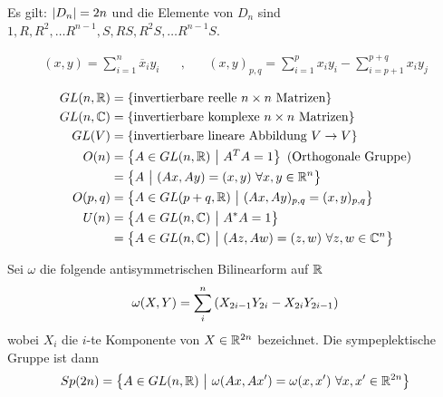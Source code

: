 \begin{lemma}
    Es gilt: $\left\vert D_n \right\vert = 2n$ und die Elemente von $D_n$ sind
    $1,R,R^2,\dots R^{n-1},S,RS,R^2S,\dots R^{n-1} S$.
\end{lemma}

\begin{definition}[Skalarprodukt]
    \begin{align*}
        (x,y) = \sum_{i=1}^n \overline{x}_i y_i
        \hspace{20pt} , \hspace{20pt}
        (x,y)_{p,q} = \sum_{i=1}^p x_i y_i - \sum_{i=p+1}^{p+q} x_i y_j
    \end{align*}
\end{definition}

\begin{definition}
    \begin{align*}
        GL(n,\R) &= \geschwungeneklammer{\text{invertierbare reelle } n \times n \text{ Matrizen}}
        \\
        GL(n,\C) &= \geschwungeneklammer{\text{invertierbare komplexe } n \times n \text{ Matrizen}}
        \\
        GL(V) &= \geschwungeneklammer{\text{invertierbare lineare Abbildung } V \rightarrow V}
        \\
        O(n) &= \geschwungeneklammer{A \in GL(n,\R) \ \big| \ A^T A = 1} \ \text{(Orthogonale Gruppe)}
        \\
        &= \geschwungeneklammer{A \ \big| \ (Ax,Ay) = (x,y) \ \forall x,y \in \R^n}
        \\
        O(p,q) &= \geschwungeneklammer{A \in GL(p+q,\R) \ \big| \ (A x, A y)_{p,q} = (x,y)_{p,q}}
        \\
        U(n) &= \geschwungeneklammer{A \in GL(n,\C) \ \big| \ A^* A = 1}
        \\
        &= \geschwungeneklammer{A \in GL(n,\C) \ \big| \ (Az,Aw) = (z,w) \ \forall z,w \in \C^n}
        \\
    \end{align*}
\end{definition}

\begin{definition}
    Sei $\omega$ die folgende antisymmetrischen Bilinearform auf $\mathbb{R}$
    \begin{align*}
        \omega(X,Y) = \sum_i^n \left( X_{2i-1} Y_{2i} - X_{2i} Y_{2i-1} \right)
    \end{align*}
    wobei $X_i$ die $i$-te Komponente von $X \in \mathbb{R}^{2n}$ bezeichnet. Die
    sympeplektische Gruppe ist dann
    \begin{align*}
        Sp(2n) = \left\{ A \in GL(n,\mathbb{R}) \ \big| \
        \omega(Ax,Ax') = \omega(x,x') \ \forall x,x' \in \mathbb{R}^{2n} \right\}
    \end{align*}
\end{definition}

